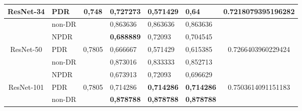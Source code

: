 \begin{table}[hbtp]
\begin{center}
\begin{tabular}{|c|l|c|l|l|l|c|}
			\multirow{-3}{*}{ResNet-34}  & PDR                                                & \multirow{-3}{*}{0,748}  & 0,727273                                          & 0,571429                                         & 0,64                                            & \multirow{-3}{*}{0.7218079395196282} \\ \hline
			& non-DR                                             &                          & 0,863636                                          & 0,863636                                         & 0,863636                                        &                                      \\ \cline{2-2} \cline{4-6}
			& NPDR                                               &                          & \textbf{0,688889}                                          & 0,72093                                          & 0,704545                                        &                                      \\ \cline{2-2} \cline{4-6}
			\multirow{-3}{*}{ResNet-50}  & PDR                                                & \multirow{-3}{*}{0,7805} & 0,666667                                          & 0,571429                                         & 0,615385                                        & \multirow{-3}{*}{0.7266403960229424} \\ \hline
			& non-DR                                             &                          & 0,873016                                          & 0,833333                                         & 0,852713                                        &                                      \\ \cline{2-2} \cline{4-6}
			& NPDR                                               &                          & 0,673913                                          & 0,72093                                          & 0,696629                                        &                                      \\ \cline{2-2} \cline{4-6}
			\multirow{-3}{*}{ResNet-101} & PDR                                                & \multirow{-3}{*}{0,7805} & 0,714286                                          & \textbf{0,714286}                                         & \textbf{0,714286}                                        & \multirow{-3}{*}{0.7503614091151183} \\ \hline
			& non-DR                                             &                          & \textbf{0,878788}                                          & \textbf{0,878788}                                         & \textbf{0,878788}                                        &                                      \\ \cline{2-2} \cline{4-6}

\end{tabular}
\end{center}
\end{table}

